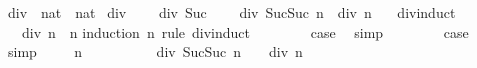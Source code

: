 \begin{isabellebody}
\isanewline
{}\isamarkupfalse%
%
\endisatagproof
{\isafoldproof}%
%
\isadelimproof
%
\endisadelimproof
%
\isadelimdocument
%
\endisadelimdocument
%
\isatagdocument
%
\isamarkuptrue%
%
\endisatagdocument
{\isafolddocument}%
%
\isadelimdocument
%
\endisadelimdocument
{}\isamarkupfalse%
\ div{}\ {\isacharcolon}{\kern0pt}{\isacharcolon}{\kern0pt}\ {\isachardoublequoteopen}nat\ {\isasymRightarrow}\ nat{\isachardoublequoteclose}\ \isanewline
{\isachardoublequoteopen}div{}\ {}\ {\isacharequal}{\kern0pt}\ {}{\isachardoublequoteclose}\ {\isacharbar}{\kern0pt}\isanewline
{\isachardoublequoteopen}div{}\ {\isacharparenleft}{\kern0pt}Suc\ {}{\isacharparenright}{\kern0pt}\ {\isacharequal}{\kern0pt}\ {}{\isachardoublequoteclose}\ {\isacharbar}{\kern0pt}\isanewline
{\isachardoublequoteopen}div{}\ {\isacharparenleft}{\kern0pt}Suc{\isacharparenleft}{\kern0pt}Suc\ n{\isacharparenright}{\kern0pt}{\isacharparenright}{\kern0pt}\ {\isacharequal}{\kern0pt}\ div{}\ n\ {\isacharplus}{\kern0pt}\ {}{\isachardoublequoteclose}\isanewline
\isanewline
{}\isamarkupfalse%
\ div{}{\isachardot}{\kern0pt}induct\isanewline
\isanewline
{}\isamarkupfalse%
\ {\isachardoublequoteopen}{}\ {\isacharasterisk}{\kern0pt}\ div{}\ n\ {\isasymle}\ n{\isachardoublequoteclose}\isanewline
%
\isadelimproof
%
\endisadelimproof
%
\isatagproof
{}\isamarkupfalse%
{\isacharparenleft}{\kern0pt}induction\ n\ rule{\isacharcolon}{\kern0pt}\ div{}{\isachardot}{\kern0pt}induct{\isacharparenright}{\kern0pt}\isanewline
\ \ \isamarkupfalse%
\ {}\isanewline
\ \ \isamarkupfalse%
\ {\isacharquery}{\kern0pt}case\ \isamarkupfalse%
\ simp\isanewline
{}\isamarkupfalse%
\isanewline
\ \ \isamarkupfalse%
\ {}\isanewline
\ \ \isamarkupfalse%
\ {\isacharquery}{\kern0pt}case\ \isamarkupfalse%
\ simp\isanewline
{}\isamarkupfalse%
\isanewline
\ \ \isamarkupfalse%
\ {\isacharparenleft}{\kern0pt}{}\ n{\isacharparenright}{\kern0pt}\isanewline
\ \ \isamarkupfalse%
\ {}\isanewline
\ \ \isamarkupfalse%
\ {\isachardoublequoteopen}{}\ {\isacharasterisk}{\kern0pt}\ div{}\ {\isacharparenleft}{\kern0pt}Suc{\isacharparenleft}{\kern0pt}Suc\ n{\isacharparenright}{\kern0pt}{\isacharparenright}{\kern0pt}\ {\isacharequal}{\kern0pt}\ {}\ {\isacharasterisk}{\kern0pt}\ div{}\ n\ {\isacharplus}{\kern0pt}\ {}{\isachardoublequoteclose}\ \isamarkupfalse%

\end{isabellebody}
